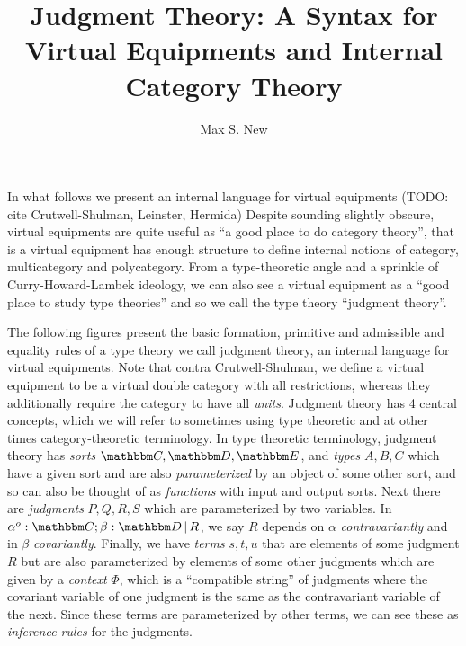 \documentclass{article}
\begin{document}
\newtheorem{theorem}{Theorem}
\newtheorem{lemma}{Lemma}
\newtheorem{definition}{Definition}
\newcommand{\pto}{\nrightarrow}
\newcommand{\pfrom}{\nleftarrow}
\newcommand{\vcat}{\mathcal}
\newcommand{\cat}{\mathbbm}
\newcommand{\vtkmnd}{\mathbb{K}\text{Mod} (\vcat{V},T)}
\newcommand{\rmod}{\text{RMod}}
\newcommand{\lmod}{\text{LMod}}

\newcommand{\id}{\text{id}}
\newcommand{\when}{\text{when}\,}
\newcommand{\sort}{\,\text{sort}}
\newcommand{\ctx}{\,\text{context}}
\newcommand{\pipe}{\,|\,}

\title{Judgment Theory: A Syntax for Virtual Equipments and Internal Category Theory}
\author{Max S. New}

\maketitle

In what follows we present an internal language for virtual equipments
(TODO: cite Crutwell-Shulman, Leinster, Hermida)
%
Despite sounding slightly obscure, virtual equipments are quite useful
as ``a good place to do category theory'', that is a virtual equipment
has enough structure to define internal notions of category,
multicategory and polycategory.
%
From a type-theoretic angle and a sprinkle of Curry-Howard-Lambek
ideology, we can also see a virtual equipment as a ``good place to
study type theories'' and so we call the type theory ``judgment
theory''.

The following figures present the basic formation, primitive and
admissible and equality rules of a type theory we call judgment
theory, an internal language for virtual equipments.
%
Note that contra Crutwell-Shulman, we define a virtual equipment to be
a virtual double category with all restrictions, whereas they
additionally require the category to have all \emph{units}.
%
Judgment theory has 4 central concepts, which we will refer to
sometimes using type theoretic and at other times category-theoretic
terminology.
%
In type theoretic terminology, judgment theory has \emph{sorts} $\cat
C, \cat D, \cat E$, and \emph{types} $A,B,C$ which have a given sort
and are also \emph{parameterized} by an object of some other sort, and
so can also be thought of as \emph{functions} with input and output
sorts.
%
Next there are \emph{judgments} $P,Q,R,S$ which are parameterized by
two variables.
%
In $\alpha^o:\cat C;\beta : \cat D \pipe R$, we say $R$ depends on
$\alpha$ \emph{contravariantly} and in $\beta$ \emph{covariantly}.
%
Finally, we have \emph{terms} $s,t,u$ that are elements of some
judgment $R$ but are also parameterized by elements of some other
judgments which are given by a \emph{context} $\Phi$, which is a
``compatible string'' of judgments where the covariant variable of one
judgment is the same as the contravariant variable of the next.
%
Since these terms are parameterized by other terms, we can see these
as \emph{inference rules} for the judgments.
\end{document}
